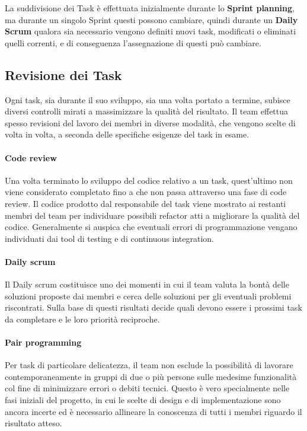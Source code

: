 La suddivisione dei Task è effettuata inizialmente durante lo \textbf{Sprint planning}, ma durante un singolo Sprint questi possono cambiare, quindi durante un \textbf{Daily Scrum} qualora sia necessario vengono definiti nuovi task, modificati o eliminati quelli correnti, e di conseguenza l'assegnazione di questi può cambiare.

\subsection{Revisione dei Task}

Ogni task, sia durante il suo sviluppo, sia una volta portato a termine, subisce diversi controlli mirati a massimizzare la qualità del risultato.
%
Il team effettua spesso revisioni del lavoro dei membri in diverse modalità, che vengono scelte di volta in volta, a seconda delle specifiche esigenze del task in esame.

\paragraph{Code review}

Una volta terminato lo sviluppo del codice relativo a un task, quest'ultimo non viene considerato completato fino a che non passa attraverso una fase di code review.
%
Il codice prodotto dal responsabile del task viene mostrato ai restanti membri del team per individuare possibili refactor atti a migliorare la qualità del codice.
%
Generalmente si auspica che eventuali errori di programmazione vengano individuati dai tool di testing e di continuous integration.

\paragraph{Daily scrum}

Il Daily scrum costituisce uno dei momenti in cui il team valuta la bontà delle soluzioni proposte dai membri e cerca delle soluzioni per gli eventuali problemi riscontrati.
%
Sulla base di questi risultati decide quali devono essere i prossimi task da completare e le loro priorità reciproche.

\paragraph{Pair programming}

Per task di particolare delicatezza, il team non esclude la possibilità di lavorare contemporaneamente in gruppi di due o più persone sulle medesime funzionalità col fine di minimizzare errori o debiti tecnici.
%
Questo è vero specialmente nelle fasi iniziali del progetto, in cui le scelte di design e di implementazione sono ancora incerte ed è necessario allineare la conoscenza di tutti i membri riguardo il risultato atteso.

